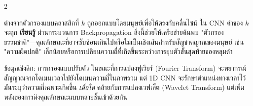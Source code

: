 \begin{paracol}{2}
\begin{thai}
ต่างจากตัวกรองแบบคลาสสิกที่ $k$ ถูกออกแบบโดยมนุษย์เพื่อให้ตรงกับคลื่นไซน์ ใน CNN ค่าของ $k$ จะถูก \textbf{เรียนรู้} ผ่านกระบวนการ Backpropagation สิ่งนี้ช่วยให้เครือข่ายค้นพบ "ตัวกรองธรรมชาติ"—คุณลักษณะที่อาจซับซ้อนเกินไปหรือไม่เป็นเชิงเส้นสำหรับสัญชาตญาณของมนุษย์ เช่น "ความผิดปกติ" เล็กน้อยหรือการเปลี่ยนความถี่ที่เกิดขึ้นระหว่างการยุบตัวขั้นสุดท้ายของหลุมดำ

\begin{physbox}{ข้อมูลเชิงลึก: การกรองแบบปรับตัว}
ในขณะที่การแปลงฟูเรียร์ (Fourier Transform) จะพยากรณ์สัญญาณจากโดเมนเวลาไปยังโดเมนความถี่ในภาพรวม แต่ 1D CNN จะรักษาตำแหน่งทางเวลาไว้ มันระบุว่าความถี่เฉพาะเกิดขึ้น \textit{เมื่อใด} คล้ายกับการแปลงเวฟเล็ต (Wavelet Transform) แต่เพิ่มพลังของการดึงคุณลักษณะแบบหลายชั้นเข้าด้วยกัน
\end{physbox}
\end{thai}
\end{paracol}
